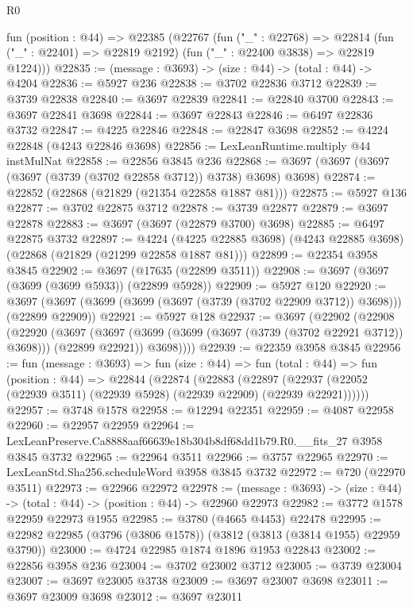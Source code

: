 \begin{lexlean}{R0}
\begin{coremodule}
  fun (position : @44) =>
  @22385
    (@22767
      (fun ("_" : @22768) =>
      @22814 (fun ("_" : @22401) => @22819 @2192) (fun ("_" : @22400 @3838) => @22819 @1224)))
@22835 := (message : @3693) -> (size : @44) -> (total : @44) -> @4204
@22836 := @5927 @236
@22838 := @3702 @22836 @3712
@22839 := @3739 @22838
@22840 := @3697 @22839
@22841 := @22840 @3700
@22843 := @3697 @22841 @3698
@22844 := @3697 @22843
@22846 := @6497 @22836 @3732
@22847 := @4225 @22846
@22848 := @22847 @3698
@22852 := @4224 @22848 (@4243 @22846 @3698)
@22856 := LexLeanRuntime.multiply @44 instMulNat
@22858 := @22856 @3845 @236
@22868 := @3697 (@3697 (@3697 (@3697 (@3739 (@3702 @22858 @3712)) @3738) @3698) @3698)
@22874 := @22852 (@22868 (@21829 (@21354 @22858 @1887 @81)))
@22875 := @5927 @136
@22877 := @3702 @22875 @3712
@22878 := @3739 @22877
@22879 := @3697 @22878
@22883 := @3697 (@3697 (@22879 @3700) @3698)
@22885 := @6497 @22875 @3732
@22897 := @4224
    (@4225 @22885 @3698)
    (@4243 @22885 @3698)
    (@22868 (@21829 (@21299 @22858 @1887 @81)))
@22899 := @22354 @3958 @3845
@22902 := @3697 (@17635 (@22899 @3511))
@22908 := @3697 (@3697 (@3699 (@3699 @5933)) (@22899 @5928))
@22909 := @5927 @120
@22920 := @3697 (@3697 (@3699 (@3699 (@3697 (@3739 (@3702 @22909 @3712)) @3698))) (@22899 @22909))
@22921 := @5927 @128
@22937 := @3697
    (@22902
      (@22908
        (@22920
          (@3697
            (@3697 (@3699 (@3699 (@3697 (@3739 (@3702 @22921 @3712)) @3698))) (@22899 @22921))
            @3698))))
@22939 := @22359 @3958 @3845
@22956 := fun (message : @3693) =>
  fun (size : @44) =>
  fun (total : @44) =>
  fun (position : @44) =>
  @22844
    (@22874
      (@22883
        (@22897 (@22937 (@22052 (@22939 @3511) (@22939 @5928) (@22939 @22909) (@22939 @22921))))))
@22957 := @3748 @1578
@22958 := @12294 @22351
@22959 := @4087 @22958
@22960 := @22957 @22959
@22964 := LexLeanPreserve.Ca8888aaf66639e18b304b8df68dd1b79.R0.__fits_27 @3958 @3845 @3732
@22965 := @22964 @3511
@22966 := @3757 @22965
@22970 := LexLeanStd.Sha256.scheduleWord @3958 @3845 @3732
@22972 := @720 (@22970 @3511)
@22973 := @22966 @22972
@22978 := (message : @3693) -> (size : @44) -> (total : @44) -> (position : @44) -> @22960 @22973
@22982 := @3772 @1578 @22959 @22973 @1955
@22985 := @3780 (@4665 @4453) @22478
@22995 := @22982 @22985 (@3796 (@3806 @1578)) (@3812 (@3813 (@3814 @1955) @22959 @3790))
@23000 := @4724 @22985 @1874 @1896 @1953 @22843
@23002 := @22856 @3958 @236
@23004 := @3702 @23002 @3712
@23005 := @3739 @23004
@23007 := @3697 @23005 @3738
@23009 := @3697 @23007 @3698
@23011 := @3697 @23009 @3698
@23012 := @3697 @23011

\end{coremodule}
\end{lexlean}
